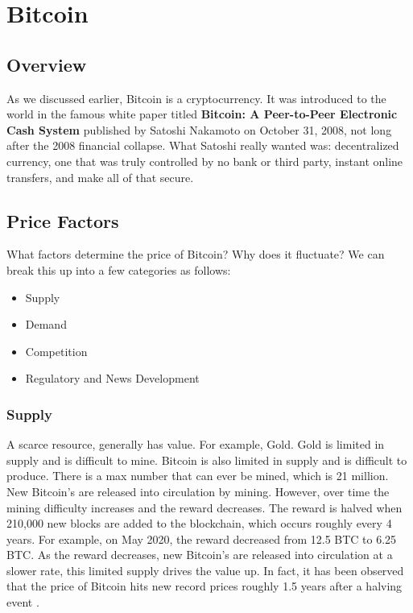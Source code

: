 \documentclass[11pt]{article} %
\begin{document}
\section{Bitcoin}{}
\subsection{Overview}{}
As we discussed earlier, Bitcoin is a cryptocurrency. It was introduced to the world in the famous white paper titled \textbf{Bitcoin: A Peer-to-Peer Electronic Cash System} published by Satoshi Nakamoto on October 31, 2008, not long after the 2008 financial collapse. What Satoshi really wanted was: decentralized currency, one that was truly controlled by no bank or third party, instant online transfers, and make all of that secure.

\subsection{Price Factors}{}
What factors determine the price of Bitcoin? Why does it fluctuate? We can break this up into a few categories as follows:

\begin{itemize}
\item Supply
\item Demand
\item Competition
\item Regulatory and News Development
\end{itemize}

\subsubsection{Supply}{}
A scarce resource, generally has value. For example, Gold. Gold is limited in supply and is difficult to mine. Bitcoin is also limited in supply and is difficult to produce. There is a max number that can ever be mined, which is 21 million. New Bitcoin's are released into circulation by mining. However, over time the mining difficulty increases and the reward decreases. The reward is halved when 210,000 new blocks are added to the blockchain, which occurs roughly every 4 years. For example, on May 2020, the reward decreased from 12.5 BTC to 6.25 BTC. As the reward decreases, new Bitcoin's are released into circulation at a slower rate, this limited supply drives the value up. In fact, it has been observed that the price of Bitcoin hits new record prices roughly 1.5 years after a halving event \cite{18}.
\end{document}
